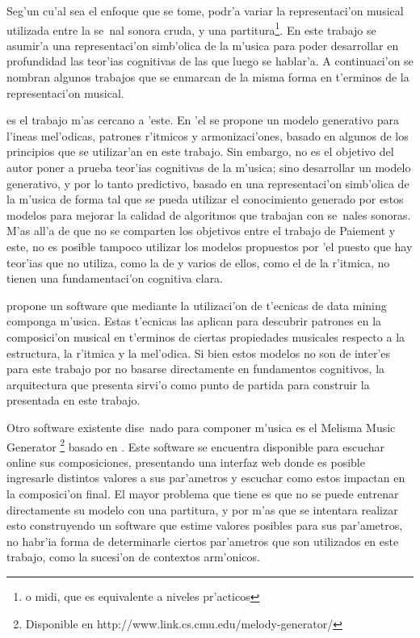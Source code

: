 Seg'un cu'al sea el enfoque que se tome, podr'a variar la representaci'on musical utilizada entre la se~nal sonora cruda, y una partitura\footnote{o midi, que es equivalente a niveles pr'acticos }.
En este trabajo se asumir'a una representaci'on simb'olica de la m'usica para poder desarrollar en profundidad las teor'ias cognitivas de las 
que luego se hablar'a. A continuaci'on se nombran algunos trabajos que se enmarcan de la misma forma en t'erminos de la representaci'on musical.

\cite{PaieThesis} es el trabajo m'as cercano a 'este. En 'el se propone un modelo generativo para l'ineas mel'odicas, 
patrones r'itmicos y armonizaci'ones, basado en algunos de los principios que se utilizar'an en este trabajo. 
Sin embargo, no es el objetivo del autor poner a prueba teor'ias cognitivas de la m'usica; sino desarrollar un modelo generativo,
y por lo tanto predictivo, basado en una representaci'on simb'olica de la m'usica de forma tal que se pueda utilizar el conocimiento generado por estos
modelos para mejorar la calidad de algoritmos que trabajan con se~nales sonoras. M'as all'a de que no se comparten los objetivos entre el trabajo de 
Paiement y este, no es posible tampoco utilizar los modelos propuestos por 'el puesto que hay teor'ias que no utiliza, como la de \cite{Lerdahl2001} 
y varios de ellos, como el de la r'itmica, no tienen una fundamentaci'on cognitiva clara.

\cite{Shih-Chuan} propone un software que mediante la utilizaci'on de t'ecnicas de data mining componga m'usica. Estas t'ecnicas las aplican
para descubrir patrones en la composici'on musical en t'erminos de ciertas propiedades musicales respecto a la estructura, la r'itmica y la mel'odica.
Si bien estos modelos no son de inter'es para este trabajo por no basarse directamente en fundamentos cognitivos, 
la arquitectura que presenta \cite{Shih-Chuan} sirvi'o como punto de partida para construir la presentada en este trabajo. 

Otro software existente dise~nado para componer m'usica es el Melisma Music Generator
\footnote{Disponible en http://www.link.cs.cmu.edu/melody-generator/} basado en \cite{Temperley2004}. 
Este software se encuentra disponible para escuchar online sus composiciones, presentando una interfaz web donde es posible ingresarle distintos
valores a sus par'ametros y escuchar como estos impactan en la composici'on final. El mayor problema 
que tiene es que no se puede entrenar directamente su modelo con una partitura, y por m'as que se intentara realizar esto construyendo un software 
que estime valores posibles para sus par'ametros, no habr'ia forma de determinarle ciertos par'ametros que son utilizados en este trabajo, 
como la sucesi'on de contextos arm'onicos.


